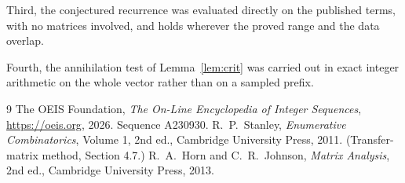 \documentclass[11pt,a4paper]{article}
\theoremstyle{plain}
\theoremstyle{definition}
\begin{document}
Third, the conjectured recurrence was evaluated directly on the published terms, with no
matrices involved, and holds wherever the proved range and the data overlap.

Fourth, the annihilation test of Lemma~\ref{lem:crit} was carried out in exact integer
arithmetic on the whole vector rather than on a sampled prefix.

\begin{thebibliography}{9}
 The OEIS Foundation, \emph{The On-Line Encyclopedia of Integer
Sequences}, \url{https://oeis.org}, 2026. Sequence A230930.
 R.~P.~Stanley, \emph{Enumerative Combinatorics}, Volume 1, 2nd ed.,
Cambridge University Press, 2011. (Transfer-matrix method, Section 4.7.)
 R.~A.~Horn and C.~R.~Johnson, \emph{Matrix Analysis}, 2nd ed., Cambridge
University Press, 2013.
\end{thebibliography}
\end{document}
